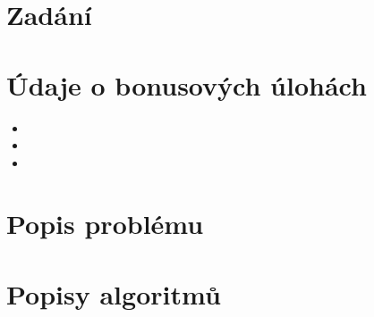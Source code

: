 \documentclass[11pt]{article}
\begin{document}



\tableofcontents

\clearpage


\section{Zadání}


\section{Údaje o bonusových úlohách}

\begin{itemize}
	\item 
	\item 
	\item 	
\end{itemize}


\section{Popis problému}

 

\section{Popisy algoritmů}
\end{document}
